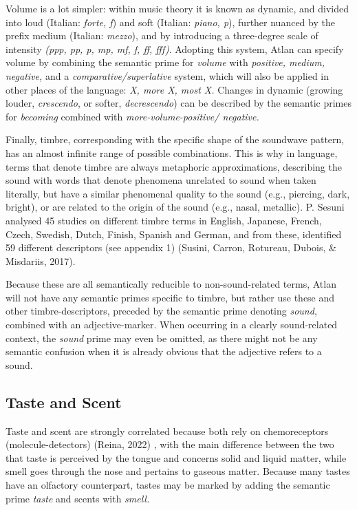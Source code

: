 Volume is a lot simpler: within music theory it is known as dynamic, and divided into loud (Italian: \textit{forte, f}) and soft (Italian: \textit{piano, p}), further nuanced by the prefix medium (Italian: \textit{mezzo}), and by introducing a three-degree scale of intensity \textit{(ppp, pp, p, mp, mf, f, ff, fff)}. Adopting this system, Atlan can specify volume by combining the semantic prime for \textit{volume} with \textit{positive, medium, negative,} and a \textit{comparative/superlative} system, which will also be applied in other places of the language: \textit{X, more X, most X.} Changes in dynamic (growing louder, \textit{crescendo}, or softer, \textit{decrescendo}) can be described by the semantic primes for \textit{becoming} combined with \textit{more-volume-positive/ negative.} 

Finally, timbre, corresponding with the specific shape of the soundwave pattern, has an almost infinite range of possible combinations. This is why in language, terms that denote timbre are always metaphoric approximations, describing the sound with words that denote phenomena unrelated to sound when taken literally, but have a similar phenomenal quality to the sound (e.g., piercing, dark, bright), or are related to the origin of the sound (e.g., nasal, metallic). P. Sesuni analysed 45 studies on different timbre terms in English, Japanese, French, Czech, Swedish, Dutch, Finish, Spanish and German, and from these, identified 59 different descriptors (see appendix 1) (Susini, Carron, Rotureau, Dubois, \& Misdariis, 2017). 

Because these are all semantically reducible to non-sound-related terms, Atlan will not have any semantic primes specific to timbre, but rather use these and other timbre-descriptors, preceded by the semantic prime denoting \textit{sound}, combined with an adjective-marker. When occurring in a clearly sound-related context, the \textit{sound} prime may even be omitted, as there might not be any semantic confusion when it is already obvious that the adjective refers to a sound. 


\subsection{Taste and Scent}

\noindent Taste and scent are strongly correlated because both rely on chemoreceptors (molecule-detectors) (Reina, 2022) , with the main difference between the two that taste is perceived by the tongue and concerns solid and liquid matter, while smell goes through the nose and pertains to gaseous matter. Because many tastes have an olfactory counterpart, tastes may be marked by adding the semantic prime \textit{taste} and scents with \textit{smell.} 

